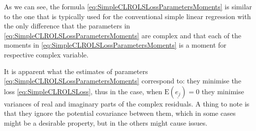 \documentclass[
]{book}
\begin{document}
As we can see, the formula \eqref{eq:SimpleCLROLSLossParametersMoments} is similar to the one that is typically used for the conventional simple linear regression with the only difference that the parameters in \eqref{eq:SimpleCLROLSLossParametersMoments} are complex and that each of the moments in \eqref{eq:SimpleCLROLSLossParametersMoments} is a moment for respective complex variable.

It is apparent what the estimates of parameters \eqref{eq:SimpleCLROLSLossParametersMoments} correspond to: they minimise the loss \eqref{eq:SimpleCLROLSLoss}, thus in the case, when \(\mathrm{E}(\underline{e_j})=0\) they minimise variances of real and imaginary parts of the complex residuals. A thing to note is that they ignore the potential covariance between them, which in some cases might be a desirable property, but in the others might cause issues.
\end{document}
